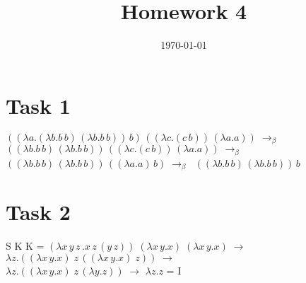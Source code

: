 \documentclass{article}
\title{Homework 4}
\date{\today}
\begin{document}
	
\maketitle

\section*{Task 1}
$((\lambda a.(\lambda b.b\,b)\,(\lambda b.b\,b))\,b)\,((\lambda c.(c\,b))\,(\lambda a.a))\; \to_\beta \;$
$((\lambda b.b\,b)\,(\lambda b.b\,b))\,((\lambda c.(c\,b))\,(\lambda a.a))\; \to_\beta \;$ \\
$((\lambda b.b\,b)\,(\lambda b.b\,b))\,((\lambda a.a)\,b)\; \to_\beta \;$
$((\lambda b.b\,b)\,(\lambda b.b\,b))\,b$

\section*{Task 2}
S K K = 
$(\lambda x\,y\,z\,.x\,z\,(y\,z))\;(\lambda x\,y.x)\;(\lambda x\,y.x)\; \to$
$\lambda z.((\lambda x\,y.x)\;z\,((\lambda x\,y.x)\;z))\; \to$ \\
$\lambda z.((\lambda x\,y.x)\;z\, (\lambda y.z))\; \to$
$\lambda z.z$
= I
	
\end{document}
